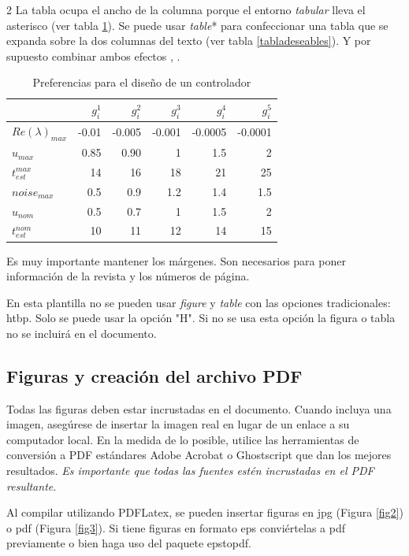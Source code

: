 \documentclass[5p,times,authoryear]{sciarticle}
\begin{document}
\begin{multicols}{2}
La tabla ocupa el ancho de la columna porque el entorno \emph{tabular} lleva el asterisco (ver tabla \ref{extremos45}). Se puede usar \emph{table}* para confeccionar una tabla que se expanda sobre la dos columnas del texto (ver tabla \ref{tabladeseables}). Y por supuesto combinar ambos efectos \citep{Heritage:92}, \citep{ChaRou:66}.

\begin{table}[H]
  \caption{Preferencias para el diseño de un controlador}
   \label{extremos45}
  \begin{tabular*}{\hsize}{lrrrrr}
\hline
    & $g_i^1$ & $g_i^2$ & $g_i^3$ & $g_i^4$ & $g_i^5$ \\
    \hline
$Re(\lambda)_{max}$ & -0.01  & -0.005 & -0.001 & -0.0005 & -0.0001 \\
$u_{max}$& 0.85 & 0.90 & 1 & 1.5 & 2  \\
$t_{est}^{max}$& 14 & 16 & 18 & 21 & 25 \\
$noise_{max}$& 0.5 & 0.9 & 1.2 & 1.4 & 1.5  \\
$u_{nom}$& 0.5 & 0.7 & 1  & 1.5 & 2  \\
$t_{est}^{nom}$& 10 & 11 & 12 & 14 & 15 \\
\hline
  \end{tabular*}
\end{table}

Es muy importante mantener los márgenes. Son necesarios para poner información de la revista y los números de página.

En esta plantilla no se pueden usar \emph{figure} y \emph{table} con las opciones tradicionales: htbp. Solo se puede usar la opción "H". Si no se usa esta opción la figura o tabla no se incluirá en el documento.

\subsection{Figuras y creación del archivo PDF}

Todas las figuras deben estar incrustadas en el documento. Cuando incluya una imagen, asegúrese de insertar la imagen real en lugar de un enlace a su computador local. En la medida de lo posible, utilice las herramientas de conversión a PDF estándares Adobe Acrobat o Ghostscript que dan los mejores resultados. \emph{Es importante que todas las fuentes estén incrustadas en el PDF resultante}.

Al compilar utilizando PDFLatex, se pueden insertar figuras en jpg (Figura \ref{fig2}) o pdf (Figura \ref{fig3}). Si tiene figuras en formato eps conviértelas a pdf previamente o bien haga uso del paquete epstopdf.


\end{multicols}
\end{document}
